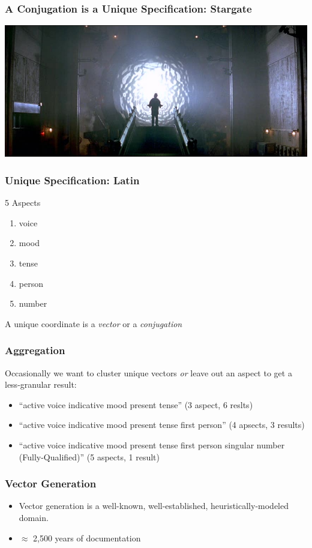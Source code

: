 \documentclass[slidestop,compress,mathserif]{beamer}
\begin{document}
\begin{frame}
	\frametitle{A Conjugation is a Unique Specification:  Stargate}
	\begin{center}
		\includegraphics[scale=0.25]{img/stargate.jpg}
		\vskip 0.5cm
	\end{center}
\end{frame}

\begin{frame}
	\frametitle{Unique Specification:  Latin}
	5 Aspects
	\begin{enumerate}
		\item voice
		\pause
		\item mood
		\pause
		\item tense
		\pause
		\item person
		\pause
		\item number
		\pause
	\end{enumerate}
	\vskip 0.5cm
	A unique coordinate is a \emph{vector} or a \emph{conjugation}
\end{frame}

\begin{frame}
	\frametitle{Aggregation}
	Occasionally we want to cluster unique vectors \emph{or} leave out an aspect to get a less-granular result:
	\pause
	\begin{itemize}
		\item ``active voice indicative mood present tense'' (3 aspect, 6 reslts)
		\pause
		\item ``active voice indicative mood present tense first person'' (4 apsects, 3 results)
		\pause
		\item ``active voice indicative mood present tense first person singular number (Fully-Qualified)'' (5 aspects, 1 result)
	\end{itemize}
\end{frame}

\begin{frame}
	\frametitle{Vector Generation}
	\begin{itemize}
		\item Vector generation is a well-known, well-established, heuristically-modeled domain.
		\pause
		\item $\approx$ 2,500 years of documentation
	\end{itemize}
\end{frame}
\end{document}
